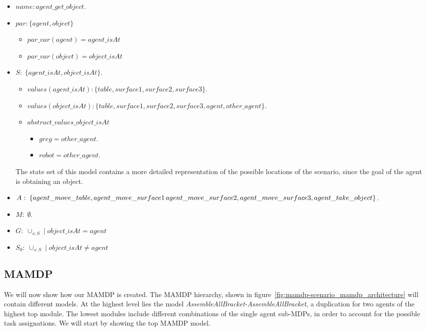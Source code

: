 \begin{itemize}
	\item $name: agent\_get\_object$.
	\item		$par: \{agent,object\}$
		\begin{itemize}
			\item $par\_var(agent)=agent\_isAt$
			\item $par\_var(object)=object\_isAt$
		\end{itemize}

	\item $S:\;\{agent\_isAt,object\_isAt\}$. 
		\begin{itemize}
			\item $values(agent\_isAt):\{table,surface1,surface2,surface3\}$.
			\item $values(object\_isAt):\{table,surface1,surface2,surface3,agent,other\_agent\}$. 
		\end{itemize}
		\begin{itemize}
			\item $abstract\_values\_object\_isAt$ 
				\begin{itemize}
					\item $greg=other\_agent$.
					\item $robot=other\_agent$.
				\end{itemize}	
		\end{itemize}
		The state set of this model contains a more detailed representation of the possible locations of the scenario, since the goal of the agent is obtaining an object.		

	\item $A:\;\{agent\_move\_table, agent\_move\_surface1\, agent\_move\_surface2, \\ 
	agent\_move\_surface3, agent\_take\_object\}$.
	\item $M:\;{\emptyset}$.
	\item $G:\; \cup_{s:S} \; | \; object\_isAt=agent$
	\item $S_0:\; \cup_{s:S} \; | \; object\_isAt \neq agent$
\end{itemize}

\subsection{MAMDP}
We will now show how our MAMDP is created. The MAMDP hierarchy, shown in figure~\ref{fig:mamdp-scenario_mamdp_architecture} will contain different models. At the highest level lies the model \textit{AssembleAllBracket-AssembleAllBracket}, a duplication for two agents of the highest top module. The lowest modules include different combinations of the single agent sub-MDPs, in order to account for the possible task assignations. We will start by showing the top MAMDP model.

